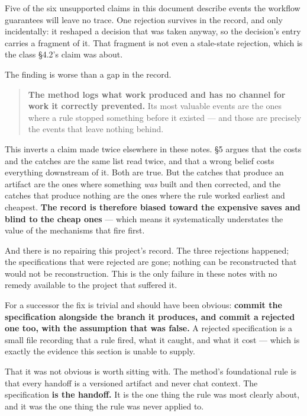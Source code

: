 Five of the six unsupported claims in this document describe events the workflow guarantees will leave no trace. One rejection survives in the record, and only incidentally: it reshaped a decision that was taken anyway, so the decision's entry carries a fragment of it. That fragment is not even a stale-state rejection, which is the class \S4.2's claim was about.

The finding is worse than a gap in the record.

\begin{quote}
\textbf{The method logs what work produced and has no channel for work it correctly prevented.} Its most valuable events are the ones where a rule stopped something before it existed --- and those are precisely the events that leave nothing behind.
\end{quote}

This inverts a claim made twice elsewhere in these notes. \S5 argues that the costs and the catches are the same list read twice, and that a wrong belief costs everything downstream of it. Both are true. But the catches that produce an artifact are the ones where something \textit{was} built and then corrected, and the catches that produce nothing are the ones where the rule worked earliest and cheapest. \textbf{The record is therefore biased toward the expensive saves and blind to the cheap ones} --- which means it systematically understates the value of the mechanisms that fire first.

And there is no repairing this project's record. The three rejections happened; the specifications that were rejected are gone; nothing can be reconstructed that would not be reconstruction. This is the only failure in these notes with no remedy available to the project that suffered it.

For a successor the fix is trivial and should have been obvious: \textbf{commit the specification alongside the branch it produces, and commit a rejected one too, with the assumption that was false.} A rejected specification is a small file recording that a rule fired, what it caught, and what it cost --- which is exactly the evidence this section is unable to supply.

That it was not obvious is worth sitting with. The method's foundational rule is that every handoff is a versioned artifact and never chat context. The specification \textbf{is the handoff.} It is the one thing the rule was most clearly about, and it was the one thing the rule was never applied to.

